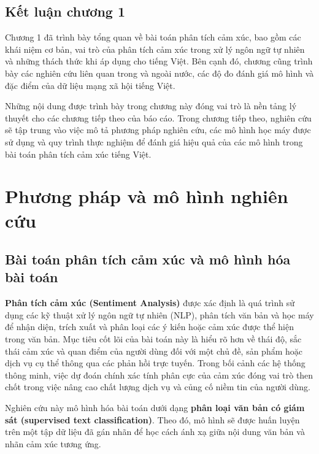 \documentclass[14pt, a4paper]{report}
\begin{document}
\section{Kết luận chương 1}

Chương 1 đã trình bày tổng quan về bài toán phân tích cảm xúc, bao gồm các khái niệm cơ bản, vai trò của phân tích cảm xúc trong xử lý ngôn ngữ tự nhiên và những thách thức khi áp dụng cho tiếng Việt. Bên cạnh đó, chương cũng trình bày các nghiên cứu liên quan trong và ngoài nước, các độ đo đánh giá mô hình và đặc điểm của dữ liệu mạng xã hội tiếng Việt.

Những nội dung được trình bày trong chương này đóng vai trò là nền tảng lý thuyết cho các chương tiếp theo của báo cáo. Trong chương tiếp theo, nghiên cứu sẽ tập trung vào việc mô tả phương pháp nghiên cứu, các mô hình học máy được sử dụng và quy trình thực nghiệm để đánh giá hiệu quả của các mô hình trong bài toán phân tích cảm xúc tiếng Việt.

\newpage

\chapter{Phương pháp và mô hình nghiên cứu}
\label{chap:chapter2}

\section{Bài toán phân tích cảm xúc và mô hình hóa bài toán}

\textbf{Phân tích cảm xúc (Sentiment Analysis)} được xác định là quá trình sử dụng các kỹ thuật xử lý ngôn ngữ tự nhiên (NLP), phân tích văn bản và học máy để nhận diện, trích xuất và phân loại các ý kiến hoặc cảm xúc được thể hiện trong văn bản. Mục tiêu cốt lõi của bài toán này là hiểu rõ hơn về thái độ, sắc thái cảm xúc và quan điểm của người dùng đối với một chủ đề, sản phẩm hoặc dịch vụ cụ thể thông qua các phản hồi trực tuyến. Trong bối cảnh các hệ thống thông minh, việc dự đoán chính xác tính phân cực của cảm xúc đóng vai trò then chốt trong việc nâng cao chất lượng dịch vụ và củng cố niềm tin của người dùng.

Nghiên cứu này mô hình hóa bài toán dưới dạng \textbf{phân loại văn bản có giám sát (supervised text classification)}. Theo đó, mô hình sẽ được huấn luyện trên một tập dữ liệu đã gán nhãn để học cách ánh xạ giữa nội dung văn bản và nhãn cảm xúc tương ứng.
\end{document}
